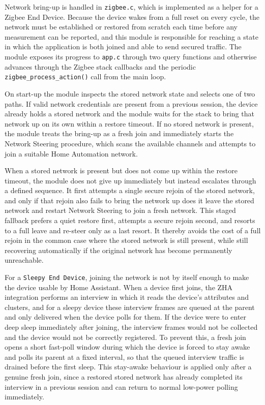 Network bring-up is handled in \texttt{zigbee.c}, which is implemented as a helper for a Zigbee End Device.
Because the device wakes from a full reset on every cycle, the network must be established or restored from scratch each time before any measurement can be reported, and this module is responsible for reaching a state in which the application is both joined and able to send secured traffic.
The module exposes its progress to \texttt{app.c} through two query functions and otherwise advances through the Zigbee stack callbacks and the periodic \texttt{zigbee\_process\_action()} call from the main loop.

On start-up the module inspects the stored network state and selects one of two paths.
If valid network credentials are present from a previous session, the device already holds a stored network and the module waits for the stack to bring that network up on its own within a restore timeout.
If no stored network is present, the module treats the bring-up as a fresh join and immediately starts the Network Steering procedure, which scans the available channels and attempts to join a suitable Home Automation network.

When a stored network is present but does not come up within the restore timeout, the module does not give up immediately but instead escalates through a defined sequence.
It first attempts a single secure rejoin of the stored network, and only if that rejoin also fails to bring the network up does it leave the stored network and restart Network Steering to join a fresh network.
This staged fallback prefers a quiet restore first, attempts a secure rejoin second, and resorts to a full leave and re-steer only as a last resort. It thereby avoids the cost of a full rejoin in the common case where the stored network is still present, while still recovering automatically if the original network has become permanently unreachable.

For a \texttt{Sleepy End Device}, joining the network is not by itself enough to make the device usable by Home Assistant.
When a device first joins, the ZHA integration performs an interview in which it reads the device's attributes and clusters, and for a sleepy device these interview frames are queued at the parent and only delivered when the device polls for them.
If the device were to enter deep sleep immediately after joining, the interview frames would not be collected and the device would not be correctly registered.
To prevent this, a fresh join opens a short fast-poll window during which the device is forced to stay awake and polls its parent at a fixed interval, so that the queued interview traffic is drained before the first sleep.
This stay-awake behaviour is applied only after a genuine fresh join, since a restored stored network has already completed its interview in a previous session and can return to normal low-power polling immediately.

